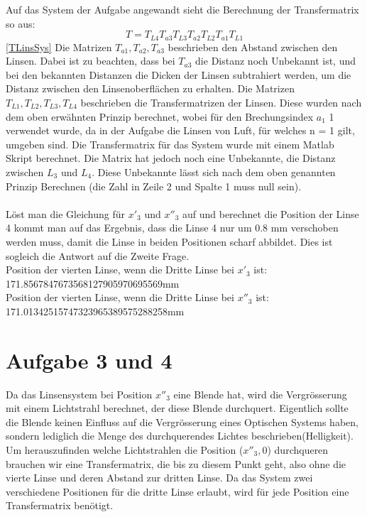 \documentclass[11pt,twoside,a4paper]{article}
\begin{document}
	Auf das System der Aufgabe angewandt sieht die Berechnung der Transfermatrix so aus: 
	\begin{equation} \label{TLinsSys}
	T = T_{L4}T_{a3}T_{L3}T_{a2}T_{L2}T_{a1}T_{L1}
	\end{equation}
	\ref{TLinsSys} Die Matrizen \(T_{a1},T_{a2},T_{a3}\) beschrieben den Abstand zwischen den Linsen. Dabei ist zu beachten, dass bei \(T_{a3}\) die Distanz noch Unbekannt ist, und bei den bekannten Distanzen die Dicken der Linsen subtrahiert werden, um die Distanz zwischen den Linsenoberflächen zu erhalten. Die Matrizen \(T_{L1},T_{L2},T_{L3},T_{L4}\) beschrieben die Transfermatrizen der Linsen. Diese wurden nach dem oben erwähnten Prinzip berechnet, wobei für den Brechungsindex \(a_{1}\) 1 verwendet wurde, da in der Aufgabe die Linsen von Luft, für welches n = 1 gilt, umgeben sind.
	Die Transfermatrix für das System wurde mit einem Matlab Skript berechnet. Die Matrix hat jedoch noch eine Unbekannte, die Distanz zwischen \(L_{3}\) und \(L_{4}\). Diese Unbekannte lässt sich nach dem oben genannten Prinzip Berechnen (die Zahl in Zeile 2 und Spalte 1 muss null sein). \\
	\\
	Löst man die Gleichung für \(x'_{3}\) und \(x''_{3}\) auf und berechnet die Position der Linse 4 kommt man auf das Ergebnis, dass die Linse 4 nur um 0.8 mm verschoben werden muss, damit die Linse in beiden Positionen scharf abbildet. Dies ist sogleich die Antwort auf die Zweite Frage. \\
	Position der vierten Linse, wenn die Dritte Linse bei \(x'_{3}\) ist: 171.8567847673568127905970695569mm \\
	Position der vierten Linse, wenn die Dritte Linse bei \(x''_{3}\) ist: 171.01342515747323965389575288258mm \\
	\section{Aufgabe 3 und 4}
	Da das Linsensystem bei Position \(x''_{3}\) eine Blende hat, wird die Vergrösserung mit einem Lichtstrahl berechnet, der diese Blende durchquert. Eigentlich sollte die Blende keinen Einfluss auf die Vergrösserung eines Optischen Systems haben, sondern lediglich die Menge des durchquerendes Lichtes beschrieben(Helligkeit). \\
	Um herauszufinden welche Lichtstrahlen die Position (\(x''_{3},0\)) durchqueren brauchen wir eine Transfermatrix, die bis zu diesem Punkt geht, also ohne die vierte Linse und deren Abstand zur dritten Linse.
	Da das System zwei verschiedene Positionen für die dritte Linse erlaubt, wird für jede Position eine Transfermatrix benötigt. 
\end{document}
